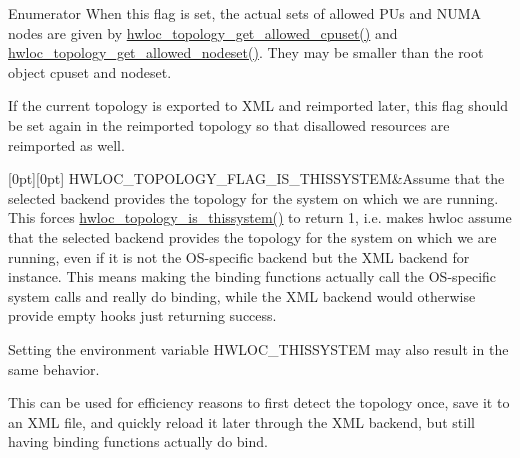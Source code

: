 \begin{DoxyEnumFields}{Enumerator}
When this flag is set, the actual sets of allowed P\+Us and N\+U\+MA nodes are given by \hyperlink{a00202_ga517d5d68ec9f24583d8933aab713be8e}{hwloc\+\_\+topology\+\_\+get\+\_\+allowed\+\_\+cpuset()} and \hyperlink{a00202_ga21a4d7237a11e76b912ed4524ab78cbd}{hwloc\+\_\+topology\+\_\+get\+\_\+allowed\+\_\+nodeset()}. They may be smaller than the root object cpuset and nodeset.

If the current topology is exported to X\+ML and reimported later, this flag should be set again in the reimported topology so that disallowed resources are reimported as well. \\
\hline

[0pt][0pt]{}\mbox{\label{a00193_ggada025d3ec20b4b420f8038d23d6e7bdea6ecb6abc6a0bb75e81564f8bca85783b}} 
H\+W\+L\+O\+C\+\_\+\+T\+O\+P\+O\+L\+O\+G\+Y\+\_\+\+F\+L\+A\+G\+\_\+\+I\+S\+\_\+\+T\+H\+I\+S\+S\+Y\+S\+T\+EM&Assume that the selected backend provides the topology for the system on which we are running. This forces \hyperlink{a00193_ga68ffdcfd9175cdf40709801092f18017}{hwloc\+\_\+topology\+\_\+is\+\_\+thissystem()} to return 1, i.\+e. makes hwloc assume that the selected backend provides the topology for the system on which we are running, even if it is not the O\+S-\/specific backend but the X\+ML backend for instance. This means making the binding functions actually call the O\+S-\/specific system calls and really do binding, while the X\+ML backend would otherwise provide empty hooks just returning success.

Setting the environment variable H\+W\+L\+O\+C\+\_\+\+T\+H\+I\+S\+S\+Y\+S\+T\+EM may also result in the same behavior.

This can be used for efficiency reasons to first detect the topology once, save it to an X\+ML file, and quickly reload it later through the X\+ML backend, but still having binding functions actually do bind. \\
\hline


\end{DoxyEnumFields}
